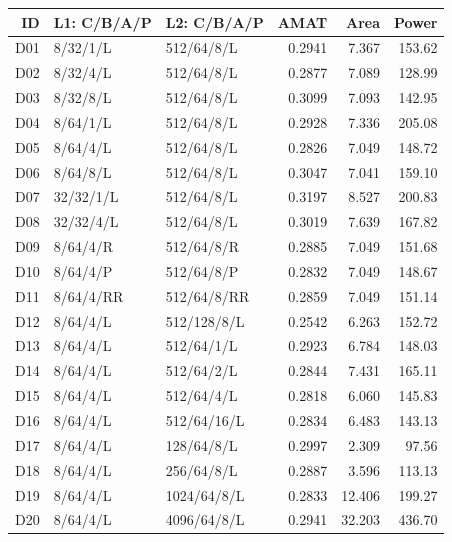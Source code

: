 \begin{tabular}{rllrrr}\toprule
ID & L1: C/B/A/P & L2: C/B/A/P & AMAT & Area & Power \\ \midrule
D01 & 8/32/1/L & 512/64/8/L & 0.2941 & 7.367 & 153.62 \\
D02 & 8/32/4/L & 512/64/8/L & 0.2877 & 7.089 & 128.99 \\
D03 & 8/32/8/L & 512/64/8/L & 0.3099 & 7.093 & 142.95 \\
D04 & 8/64/1/L & 512/64/8/L & 0.2928 & 7.336 & 205.08 \\
D05 & 8/64/4/L & 512/64/8/L & 0.2826 & 7.049 & 148.72 \\
D06 & 8/64/8/L & 512/64/8/L & 0.3047 & 7.041 & 159.10 \\
D07 & 32/32/1/L & 512/64/8/L & 0.3197 & 8.527 & 200.83 \\
D08 & 32/32/4/L & 512/64/8/L & 0.3019 & 7.639 & 167.82 \\
D09 & 8/64/4/R & 512/64/8/R & 0.2885 & 7.049 & 151.68 \\
D10 & 8/64/4/P & 512/64/8/P & 0.2832 & 7.049 & 148.67 \\
D11 & 8/64/4/RR & 512/64/8/RR & 0.2859 & 7.049 & 151.14 \\
D12 & 8/64/4/L & 512/128/8/L & 0.2542 & 6.263 & 152.72 \\
D13 & 8/64/4/L & 512/64/1/L & 0.2923 & 6.784 & 148.03 \\
D14 & 8/64/4/L & 512/64/2/L & 0.2844 & 7.431 & 165.11 \\
D15 & 8/64/4/L & 512/64/4/L & 0.2818 & 6.060 & 145.83 \\
D16 & 8/64/4/L & 512/64/16/L & 0.2834 & 6.483 & 143.13 \\
D17 & 8/64/4/L & 128/64/8/L & 0.2997 & 2.309 & 97.56 \\
D18 & 8/64/4/L & 256/64/8/L & 0.2887 & 3.596 & 113.13 \\
D19 & 8/64/4/L & 1024/64/8/L & 0.2833 & 12.406 & 199.27 \\
D20 & 8/64/4/L & 4096/64/8/L & 0.2941 & 32.203 & 436.70 \\
\bottomrule\end{tabular}
